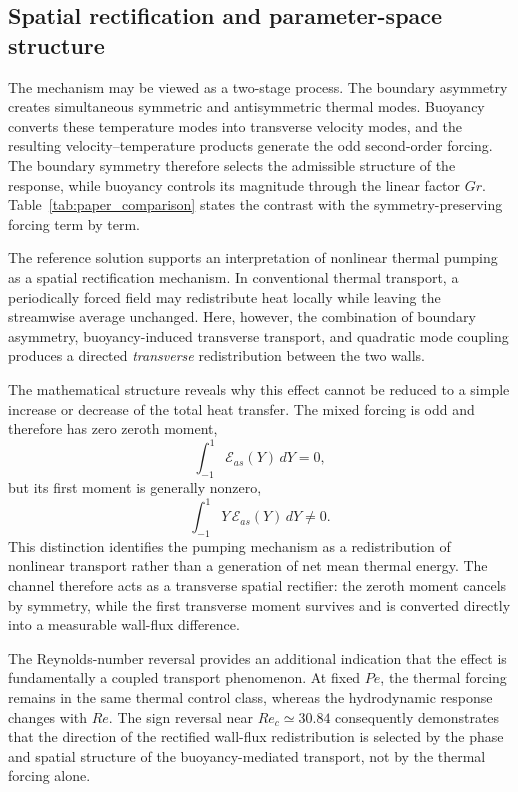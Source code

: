 \documentclass[12pt,a4paper]{article}
\newcommand{\Rey}{\mathit{Re}}
\newcommand{\Pe}{\mathit{Pe}}
\newcommand{\Grr}{\mathit{Gr}}
\begin{document}
\subsection{Spatial rectification and parameter-space structure}
\label{subsec:rectification}

The mechanism may be viewed as a two-stage process. The boundary asymmetry creates simultaneous symmetric
and antisymmetric thermal modes. Buoyancy converts these temperature modes into transverse velocity modes,
and the resulting velocity--temperature products generate the odd second-order forcing. The boundary
symmetry therefore selects the admissible structure of the response, while buoyancy controls its magnitude
through the linear factor $\Grr$.
Table~\ref{tab:paper_comparison} states the contrast with the symmetry-preserving forcing term by
term.


The reference solution supports an interpretation of nonlinear thermal
pumping as a spatial rectification mechanism. In conventional thermal
transport, a periodically forced field may redistribute heat locally while
leaving the streamwise average unchanged. Here, however, the combination of
boundary asymmetry, buoyancy-induced transverse transport, and quadratic mode
coupling produces a directed \emph{transverse} redistribution between the
two walls.

The mathematical structure reveals why this effect cannot be reduced to a
simple increase or decrease of the total heat transfer. The mixed forcing is
odd and therefore has zero zeroth moment,
\begin{equation}
\int_{-1}^{1}\mathcal{E}_{as}(Y)\,dY=0,
\end{equation}
but its first moment is generally nonzero,
\begin{equation}
\int_{-1}^{1}Y\,\mathcal{E}_{as}(Y)\,dY\neq0.
\end{equation}
This distinction identifies the pumping mechanism as a redistribution
of nonlinear transport rather than a generation of net mean thermal
energy. The channel therefore acts as a transverse spatial rectifier:
the zeroth moment cancels by symmetry, while the first transverse moment
survives and is converted directly into a measurable wall-flux
difference.

The Reynolds-number reversal provides an additional indication that the
effect is fundamentally a coupled transport phenomenon. At fixed $\Pe$,
the thermal forcing remains in the same thermal control class, whereas the
hydrodynamic response changes with $\Rey$. The sign reversal near
$\Rey_c\simeq30.84$ consequently demonstrates that the direction of the
rectified wall-flux redistribution is selected by the phase and spatial
structure of the buoyancy-mediated transport, not by the thermal forcing
alone.
\end{document}
